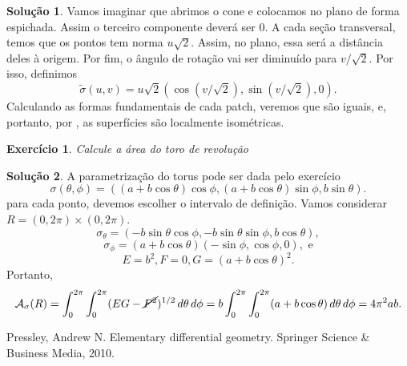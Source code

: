 \documentclass[a4paper,12pt]{article}
\theoremstyle{exer}
\newtheorem{exercise}{Exercício}
\theoremstyle{definition}
\newtheorem{solution}{Solução}
\theoremstyle{plain}
\begin{document}
\begin{solution}
    Vamos imaginar que abrimos o cone e colocamos no plano de forma espichada.
    Assim o terceiro componente deverá ser 0. A cada seção transversal, temos
    que os pontos tem norma $u\sqrt{2}$. Assim, no plano, essa será a
    distância deles à origem. Por fim, o ângulo de rotação vai ser diminuído
    para $v/\sqrt{2}$. Por isso, definimos 
    $$
    \tilde{\sigma}(u,v) = u\sqrt{2}\left(\cos(v/\sqrt{2}), \sin(v/\sqrt{2}), 0\right).
    $$
    Calculando as formas fundamentais de cada patch, veremos que são iguais,
    e, portanto, por \cite[Corolário 6.2.3]{pressley}, as superfícies são
    localmente isométricas. 
\end{solution}

\begin{exercise}
    Calcule a área do toro de revolução
\end{exercise}

\begin{solution}
    A parametrização do torus pode ser dada pelo exercício \cite[4.2.5]{pressley}
    $$
    \sigma(\theta, \phi) = ((a + b \cos \theta) \cos \phi, (a + b \cos \theta) \sin \phi, b \sin \theta).  
    $$
    para cada ponto, devemos escolher o intervalo de definição. Vamos
    considerar $R = (0,2\pi) \times (0,2\pi)$.
    $$
    \sigma_{\theta} = (-b\sin\theta\cos\phi, -b\sin\theta\sin\phi,b\cos\theta),
    $$
    $$
    \sigma_{\phi} = (a+b\cos\theta)(-\sin\phi, \cos\phi,0), \text{ e}
    $$
    $$
    E = b^2, F = 0, G = (a + b\cos\theta)^2.
    $$
    Portanto, 
    $$
    \mathcal{A}_{\sigma}(R) = \int_0^{2\pi}\int_0^{2\pi} (EG - \cancel{F^2})^{1/2} \, d\theta \, d\phi = b\int_0^{2\pi} \int_0^{2\pi} (a + b\cos\theta) \, d\theta \, d\phi = 4\pi^2 ab.
    $$
\end{solution}

\begin{thebibliography}{9}
     Pressley, Andrew N. Elementary differential geometry. Springer Science \& Business Media, 2010.
\end{thebibliography}
\end{document}
